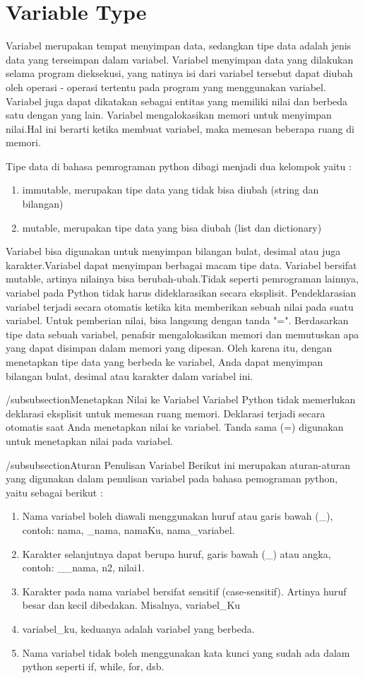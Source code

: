 \section{Variable Type}
Variabel merupakan tempat menyimpan data, sedangkan tipe data adalah jenis data yang terseimpan dalam variabel. Variabel menyimpan data yang dilakukan selama program dieksekusi, yang natinya isi dari variabel tersebut dapat diubah oleh operasi - operasi tertentu pada program yang menggunakan variabel. Variabel juga dapat dikatakan sebagai entitas yang memiliki nilai dan berbeda satu dengan yang lain. Variabel mengalokasikan memori untuk menyimpan nilai.Hal ini berarti ketika membuat variabel, maka  memesan beberapa ruang di memori. 

Tipe data di bahasa pemrograman python dibagi menjadi dua kelompok yaitu :
\begin{enumerate}
	\item immutable, merupakan tipe data yang tidak bisa diubah (string dan bilangan)
	\item mutable, merupakan tipe data yang bisa diubah (list dan dictionary)
\end{enumerate}  

Variabel bisa digunakan untuk menyimpan bilangan bulat, desimal atau juga karakter.Variabel dapat menyimpan berbagai macam tipe data. Variabel bersifat mutable, artinya nilainya bisa berubah-ubah.Tidak seperti pemrograman lainnya, variabel pada Python tidak harus dideklarasikan secara eksplisit. Pendeklarasian variabel terjadi secara otomatis ketika kita memberikan sebuah nilai pada suatu variabel. Untuk pemberian nilai, bisa langsung dengan tanda "=". Berdasarkan tipe data sebuah variabel, penafsir mengalokasikan memori dan memutuskan apa yang dapat disimpan dalam memori yang dipesan. Oleh karena itu, dengan menetapkan tipe data yang berbeda ke variabel, Anda dapat menyimpan bilangan bulat, desimal atau karakter dalam variabel ini.

/subsubsection{Menetapkan Nilai ke Variabel}
Variabel Python tidak memerlukan deklarasi eksplisit untuk memesan ruang memori. Deklarasi terjadi secara otomatis saat Anda menetapkan nilai ke variabel. Tanda sama (=) digunakan untuk menetapkan nilai pada variabel.

/subsubsection{Aturan Penulisan Variabel}
Berikut ini merupakan aturan-aturan yang digunakan dalam penulisan variabel pada bahasa pemograman python, yaitu sebagai berikut :
\begin{enumerate}
	\item Nama variabel boleh diawali menggunakan huruf atau garis bawah (_), contoh: nama, _nama, namaKu, nama_variabel.
	\item Karakter selanjutnya dapat berupa huruf, garis bawah (_) atau angka, contoh: __nama, n2, nilai1.
	\item Karakter pada nama variabel bersifat sensitif (case-sensitif). Artinya huruf besar dan kecil dibedakan. Misalnya, variabel_Ku
	\item variabel_ku, keduanya adalah variabel yang berbeda.
	\item Nama variabel tidak boleh menggunakan kata kunci yang sudah ada dalam python seperti if, while, for, dsb.
\end{enumerate}  

